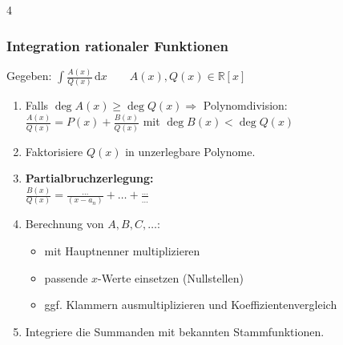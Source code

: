 \documentclass[6pt,a4paper]{scrartcl}
\newcommand{\Ra}[0]{\ensuremath{\Rightarrow}}
\begin{document}
\begin{multicols*}{4}
    \subsubsection{Integration rationaler Funktionen}

    Gegeben: $\int \frac{A(x)}{Q(x)} \,\mathrm dx \qquad A(x), Q(x) \in \mathbb R[x]$
    \begin{enumerate}\itemsep0pt
        \item Falls $\deg A(x) \ge \deg Q(x) \Ra$ Polynomdivision: \\
              $\frac{A(x)}{Q(x)} = P(x) + \frac{B(x)}{Q(x)}$ mit $\deg B(x) < \deg Q(x)$

        \item Faktorisiere $Q(x)$ in unzerlegbare Polynome.

        \item \textbf{Partialbruchzerlegung:} \\
              $\frac{B(x)}{Q(x)} = \frac{\ldots}{(x - a_n)} + \ldots + \frac{\ldots}{\ldots}$

        \item Berechnung von $A, B, C, \ldots$:
              \begin{itemize}
                  \item mit Hauptnenner multiplizieren
                  \item passende $x$-Werte einsetzen (Nullstellen)
                  \item ggf. Klammern ausmultiplizieren und Koeffizientenvergleich
              \end{itemize}

        \item Integriere die Summanden mit bekannten Stammfunktionen.
    \end{enumerate}



\end{multicols*}
\end{document}
